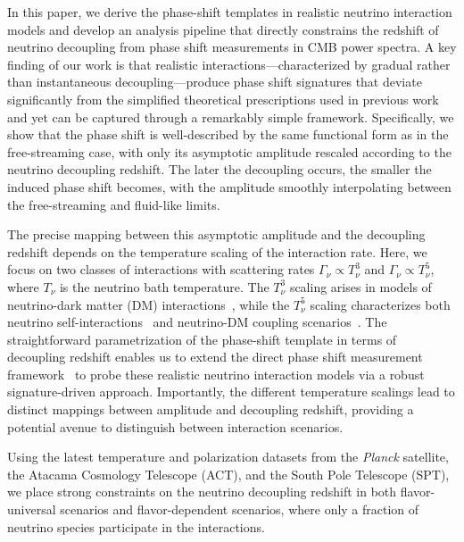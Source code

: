 In this paper, we derive the phase-shift templates in realistic neutrino interaction models and develop an analysis pipeline that directly constrains the redshift of neutrino decoupling from phase shift measurements in CMB power spectra. A key finding of our work is that realistic interactions---characterized by gradual rather than instantaneous decoupling---produce phase shift signatures that deviate significantly from the simplified theoretical prescriptions used in previous work~\cite{Choi:2018gho,Loverde:2022wih} and yet can be captured through a remarkably simple framework. Specifically, we show that the phase shift is well-described by the same functional form as in the free-streaming case, with only its asymptotic amplitude rescaled according to the neutrino decoupling redshift. The later the decoupling occurs, the smaller the induced phase shift becomes, with the amplitude smoothly interpolating between the free-streaming and fluid-like limits.

The precise mapping between this asymptotic amplitude and the decoupling redshift depends on the temperature scaling of the interaction rate. Here, we focus on two classes of interactions with scattering rates $\Gamma_\nu\propto T_\nu^3$ and $\Gamma_\nu\propto T_\nu^5$, where $T_\nu$ is the neutrino bath temperature. The $T_\nu^3$ scaling arises in models of neutrino-dark matter (DM) interactions~\cite{Boehm:2003hm,Stadler:2019dii,Serra:2009uu,Olivares-DelCampo:2017feq,Ghosh:2017jdy}, while the $T_\nu^5$ scaling characterizes both neutrino self-interactions~\cite{Cyr-Racine:2013jua,Oldengott:2014qra,Oldengott:2017fhy,Kreisch:2019yzn,Das:2020xke,Das:2023npl,RoyChoudhury:2020dmd,Lancaster:2017ksf,Camarena:2023cku,Poudou:2025qcx,He:2023oke,He:2025jwp} and neutrino-DM coupling scenarios~\cite{Wilkinson:2014ksa,Escudero:2015yka,DiValentino:2017oaw,Ghosh:2019tab,Mosbech:2020ahp,He:2025jwp}. The straightforward parametrization of the phase-shift template in terms of decoupling redshift enables us to extend the direct phase shift measurement framework~\cite{Follin:2015hya,Montefalcone:2025unv} to probe these realistic neutrino interaction models via a robust signature-driven approach. Importantly, the different temperature scalings lead to distinct mappings between amplitude and decoupling redshift, providing a potential avenue to distinguish between interaction scenarios.

Using the latest temperature and polarization datasets from the \textit{Planck} satellite, the Atacama Cosmology Telescope (ACT), and the South Pole Telescope (SPT), we place strong constraints on the neutrino decoupling redshift in both flavor-universal scenarios and flavor-dependent scenarios, where only a fraction of neutrino species participate in the interactions.

